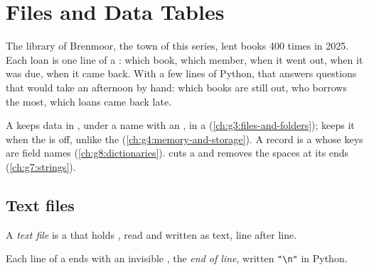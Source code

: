 \chapter{Files and Data Tables}\label{ch:g8:files-and-data-tables}

The library of Brenmoor, the town of this series, lent books 400 times in
2025. Each loan is one line of a : which book, which member, when it
went out, when it was due, when it came back. With a few lines of Python, that
 answers questions that would take an afternoon by hand: which books are
still out, who borrows the most, which loans came back late.

\begin{recall}
A  keeps data in , under a name with an , in a 
(\cref{ch:g3:files-and-folders});  keeps it when the  is off,
unlike the  (\cref{ch:g4:memory-and-storage}). A record is a 
whose keys are field names (\cref{ch:g8:dictionaries}).  cuts a
 and  removes the spaces at its ends
(\cref{ch:g7:strings}).
\end{recall}

\section{Text files}

\begin{definition}\label{def:g8:files-and-data-tables:text-file}
A \emph{text file} is a  that holds , read and
written as text, line after line.
\end{definition}

\begin{definition}\label{def:g8:files-and-data-tables:newline}
Each line of a  ends with an invisible , the \emph{end of
line}, written \texttt{"\textbackslash n"} in Python.
\end{definition}

